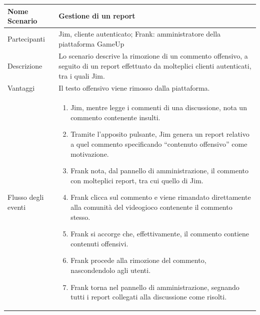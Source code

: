 	\small\begin{tabular}{|| l | p{30em} ||} 
	\hline
	Nome Scenario & Gestione di un report\\
	\hline
	Partecipanti & Jim, cliente autenticato;
	Frank: amministratore della piattaforma GameUp\\
	\hline
	Descrizione & Lo scenario descrive la rimozione di un commento offensivo, a seguito di un report effettuato da molteplici clienti autenticati, tra i quali Jim.\\
	\hline
	Vantaggi & Il testo offensivo viene rimosso dalla piattaforma.\\
	\hline
	Flusso degli eventi &
	\begin{enumerate}
		\item Jim, mentre legge i commenti di una discussione, nota un commento contenente insulti.
		\item Tramite l’apposito pulsante, Jim genera un report relativo a quel commento specificando “contenuto offensivo” come motivazione.
		\item Frank nota, dal pannello di amministrazione, il commento con molteplici report, tra cui quello di Jim.
		\item Frank clicca sul commento e viene rimandato direttamente alla comunità del videogioco contenente il commento stesso.
		\item Frank si accorge che, effettivamente, il commento contiene contenuti offensivi.
		\item Frank procede alla rimozione del commento, nascondendolo agli utenti.
		\item Frank torna nel pannello di amministrazione, segnando tutti i report collegati alla discussione come risolti.		
	\end{enumerate} \\
	\hline
	\end{tabular}


